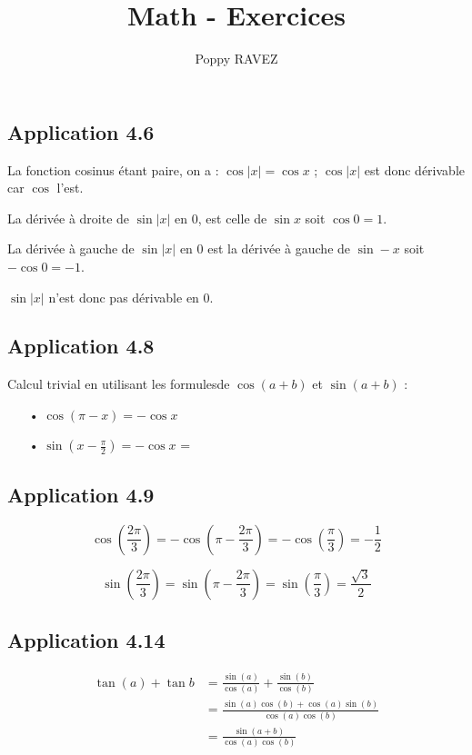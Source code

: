 \documentclass[a4paper,10pt]{report}
\title{Math - Exercices}
\author{Poppy RAVEZ}
\begin{document}
	
\subsection*{Application 4.6}

La fonction cosinus étant paire, on a : $\cos|x| = \cos x$ ; $\cos|x|$ est donc dérivable car $\cos$ l'est.

La dérivée à droite de $\sin |x|$ en $0$, est celle de $\sin x$ soit $\cos 0 = 1$.

La dérivée à gauche de $\sin |x|$ en $0$ est la dérivée à gauche de $\sin -x$ soit $-\cos 0 = -1$.

$\sin |x|$ n'est donc pas dérivable en $0$.

\subsection*{Application 4.8}

Calcul trivial en utilisant les formulesde $\cos(a+b)$ et $\sin(a+b)$ :
\begin{itemize}
	\item[•] $\cos(\pi-x) = -\cos x$
	\item[•] $\sin(x- \frac{\pi}{2}) = -\cos x$ =
\end{itemize}

\subsection*{Application 4.9}

\begin{displaymath}
	\cos\left( \frac{2\pi}{3}\right) = - \cos\left( \pi - \frac{2\pi}{3}\right) = -\cos\left( \frac{\pi}{3}\right) = -\frac{1}{2}
\end{displaymath}

\begin{displaymath}
	\sin\left( \frac{2\pi}{3}\right) =  \sin\left( \pi - \frac{2\pi}{3}\right) = \sin\left( \frac{\pi}{3}\right) = \frac{\sqrt{3}}{2}
\end{displaymath}

\subsection*{Application 4.14}

\begin{equation*}
	\begin{split}
		\tan(a) + \tan b &= \frac{\sin(a)}{\cos(a)} + \frac{\sin(b)}{\cos(b)} \\
		                 &=\frac{\sin(a)\cos(b) + \cos(a)\sin(b)}{\cos(a)\cos(b)} \\
		                 &= \frac{\sin(a+b)}{\cos(a)\cos(b)}
	\end{split}
\end{equation*}
\end{document}
